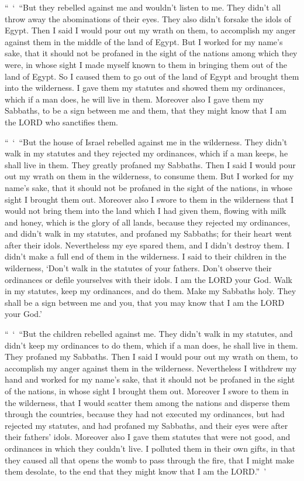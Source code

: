 \myverse{}“ ‘ “But they rebelled against me and wouldn’t listen to me. They
didn’t all throw away the abominations of their eyes. They also didn’t forsake the idols of Egypt. Then
I said I would pour out my wrath on them, to accomplish my anger against them in the middle of the land
of Egypt.
\myverse{}But I worked for my name’s sake, that it should not be profaned in the sight
of the nations among which they were, in whose sight I made myself known to them in bringing them out
of the land of Egypt.
\myverse{}So I caused them to go out of the land of Egypt and brought them into the
wilderness.
\myverse{}I gave them my statutes and showed them my ordinances, which if a man does,
he will live in them.
\myverse{}Moreover also I gave them my Sabbaths, to be a sign between me and them,
that they might know that I am the LORD who sanctifies them.

\myverse{}“ ‘ “But the house of Israel rebelled against me in the wilderness.
They didn’t walk in my statutes and they rejected my ordinances, which if a man keeps, he shall live in
them. They greatly profaned my Sabbaths. Then I said I would pour out my wrath on them in the wilderness,
to consume them.
\myverse{}But I worked for my name’s sake, that it should not be profaned in the sight
of the nations, in whose sight I brought them out.
\myverse{}Moreover also I swore to them in the wilderness that I would not bring them
into the land which I had given them, flowing with milk and honey, which is the glory of all lands,
\myverse{}because they rejected my ordinances, and didn’t walk in my statutes, and
profaned my Sabbaths; for their heart went after their idols.
\myverse{}Nevertheless my eye spared them, and I didn’t destroy them. I didn’t make
a full end of them in the wilderness.
\myverse{}I said to their children in the wilderness, ‘Don’t walk in the statutes of
your fathers. Don’t observe their ordinances or defile yourselves with their idols.
\myverse{}I am the LORD your God. Walk in my statutes, keep my ordinances, and do them.
\myverse{}Make my Sabbaths holy. They shall be a sign between me and you, that you
may know that I am the LORD your God.’

\myverse{}“ ‘ “But the children rebelled against me. They didn’t walk in
my statutes, and didn’t keep my ordinances to do them, which if a man does, he shall live in them. They
profaned my Sabbaths. Then I said I would pour out my wrath on them, to accomplish my anger against them
in the wilderness.
\myverse{}Nevertheless I withdrew my hand and worked for my name’s sake, that it should
not be profaned in the sight of the nations, in whose sight I brought them out.
\myverse{}Moreover I swore to them in the wilderness, that I would scatter them among
the nations and disperse them through the countries,
\myverse{}because they had not executed my ordinances, but had rejected my statutes,
and had profaned my Sabbaths, and their eyes were after their fathers’ idols.
\myverse{}Moreover also I gave them statutes that were not good, and ordinances in
which they couldn’t live.
\myverse{}I polluted them in their own gifts, in that they caused all that opens the
womb to pass through the fire, that I might make them desolate, to the end that they might know that I
am the LORD.” ’

